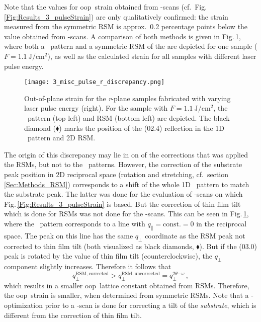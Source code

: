 Note that the values for \gls{oop}\ strain obtained from \thetaomega-scans (cf.\ Fig.\,\ref{Fig:Results_3_pulseStrain}) are only qualitatively confirmed:
the strain measured from the symmetric \gls{RSM} is approx.\ 0.2 percentage points below the value obtained from \thetaomega-scans.
A comparison of both methods is given in Fig.\,\ref{Fig:Results_3_r_strainDiscrepancy}, where both a \thetaomega\ pattern and a symmetric \acrshort{RSM} of the are depicted for one sample ($F=\qty{1.1}{\J\per\cm\squared}$), as well as the calculated strain for all samples with different laser pulse energy.
\begin{figure}[h]
    \centering
    \texttt{[image: 3\_misc\_pulse\_r\_discrepancy.png]}
    \caption{
        Out-of-plane strain for the \textit{r}-plane samples fabricated with varying laser pulse energy (right).
        For the sample with $F=\qty{1.1}{\J\per\cm\squared}$, the \thetaomega\ pattern (top left) and \gls{RSM} (bottom left) are depicted.
        The black diamond ($\blacklozenge$) marks the position of the (02.4) reflection in the 1D \thetaomega\ pattern and 2D \gls{RSM}.
    }
    \label{Fig:Results_3_r_strainDiscrepancy}
\end{figure}
The origin of this discrepancy may lie in on of the corrections that was applied the \glspl{RSM}, but not to the \thetaomega\ patterns.
However, the correction of the substrate peak position in 2D reciprocal space (rotation and stretching, cf.\ section \ref{Sec:Methods_RSM}) corresponds to a shift of the whole 1D \thetaomega\ pattern to match the substrate peak.
The latter was done for the evaluation of \thetaomega-scans on which Fig.\,\ref{Fig:Results_3_pulseStrain} is based.
But the correction of thin film tilt which is done for \glspl{RSM} was not done for the \thetaomega-scans.
This can be seen in Fig.\,\ref{Fig:Results_3_r_strainDiscrepancy}, where the \thetaomega\ pattern corresponds to a line with $q_\parallel=\mathrm{const.}=0$ in the reciprocal space.
The peak on this line has the same $q_\perp$ coordinate as the RSM peak not corrected to thin film tilt (both visualized as black diamonds, $\blacklozenge$).
But if the (03.0) peak is rotated by the value of thin film tilt (counterclockwise), the $q_\perp$ component slightly increases.
Therefore it follows that
$$q_\perp^\mathrm{RSM, corrected}
>q_\perp^\mathrm{RSM, uncorrected}
=q_\perp^{2\theta\mathrm{-}\omega}\,,$$
which results in a smaller \gls{oop}\ lattice constant obtained from RSMs.
Therefore, the \gls{oop}\ strain is smaller, when determined from symmetric RSMs.
Note that a \textomega-optimization prior to a \thetaomega-scan is done for correcting a tilt of the \textit{substrate}, which is different from the correction of thin film tilt.

